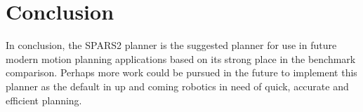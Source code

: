\documentclass[conference]{IEEEtran} \usepackage[T1]{fontenc} \usepackage[backend=biber, style=ieee]{biblatex}
\begin{document}
\section{Conclusion} \label{Conclusion}

In conclusion, the SPARS2 planner is the suggested planner for use in future modern motion planning applications based on its strong place in the benchmark comparison.
Perhaps more work could be pursued in the future to implement this planner as the default in up and coming robotics in need of quick, accurate and efficient planning.

\printbibliography
\end{document}
